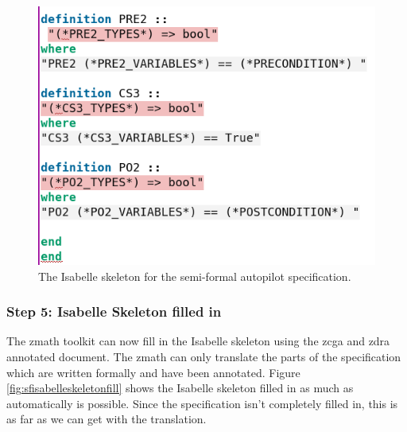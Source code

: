 \begin{figure}[H]
\begin{minipage}{0.45\textwidth}
     \includegraphics[width=\linewidth]{Figures/fullexample/sfisabelle2.png}
     \end{minipage}
     \caption{The Isabelle skeleton for the semi-formal autopilot specification. \label{fig:sfisabelleskeleton}}
\end{figure}

\subsubsection{Step 5: Isabelle Skeleton filled in}

The \gls{zmath} toolkit can now fill in the Isabelle skeleton using the
\gls{zcga} and \gls{zdra} annotated document. The \gls{zmath} can only translate
the parts of the specification which are written formally and have been
annotated. Figure \ref{fig:sfisabelleskeletonfill} shows the Isabelle skeleton filled in as much as
automatically is possible. Since the specification isn't completely filled in, this is as far as we can get
with the translation.

